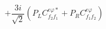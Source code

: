 %
\begin{dmath*}
%
  +  \frac{3 i}{\sqrt{2}} \left(P_L C^{e \varphi  *}_{f_2 f_1} + P_R C^{e \varphi  }_{f_1 f_2}\right)
%
\end{dmath*}
%
